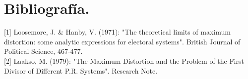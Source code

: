 \documentclass[11pt]{article}
\begin{document}
	\newpage
	
	\section*{Bibliografía.}

	[1] Loosemore, J. \& Hanby, V. (1971): "The theoretical limits of maximum distortion: some analytic expressions for electoral systems". British Journal of Political Science, 467-477.\\

	[2] Laakso, M. (1979): "The Maximum Distortion and the Problem of the First Divisor of Different P.R. Systems". Research Note.\\
	
	
\end{document}
